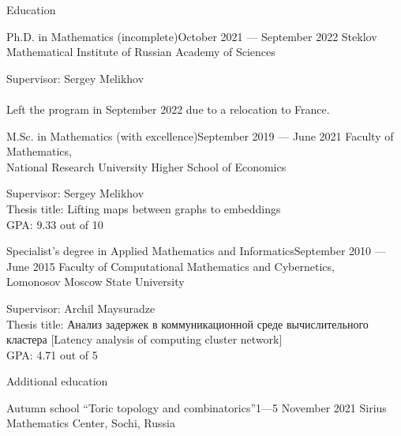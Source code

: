 \documentclass{resume}
\begin{document}
\begin{rSection}{Education}
\begin{rSubsection}{Ph.D. in Mathematics (incomplete)}{October 2021 --- September 2022}{}
  Steklov Mathematical Institute of Russian Academy of Sciences\vspace{0.5em}

  Supervisor: Sergey Melikhov \\
  \\
  Left the program in September 2022 due to a relocation to France.
\end{rSubsection}

\begin{rSubsection}{M.Sc. in Mathematics (with excellence)}{September 2019 --- June 2021}{}
  Faculty of Mathematics, \\
  National Research University Higher School of Economics \vspace{0.5em}

  Supervisor: Sergey Melikhov \\
  Thesis title: Lifting maps between graphs to embeddings \\
  GPA: 9.33 out of 10
\end{rSubsection}

\begin{rSubsection}{Specialist's degree in Applied Mathematics and Informatics}{September 2010 --- June 2015}{}
  Faculty of Computational Mathematics and Cybernetics, \\
  Lomonosov Moscow State University \vspace{0.5em}

  Supervisor: Archil Maysuradze \\
  Thesis title: Анализ задержек в коммуникационной среде вычислительного кластера [Latency analysis of computing cluster network] \\
  GPA: 4.71 out of 5
\end{rSubsection}
\end{rSection}

\begin{rSection}{Additional education}
  \begin{rSubsection}{Autumn school ``Toric topology and combinatorics''}{1---5 November 2021}{}
    Sirius Mathematics Center, Sochi, Russia
  \end{rSubsection}
\end{rSection}
\pagebreak
\end{document}
